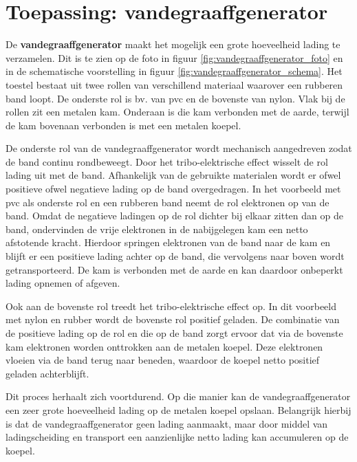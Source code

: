 \documentclass{ximera}
\begin{document}
\section{Toepassing: vandegraaffgenerator}
\begin{example}[foldable=true,title={Toepassing: vandegraaffgenerator}]\nl
    De \textbf{vandegraaffgenerator} maakt het mogelijk een grote hoeveelheid lading te verzamelen. Dit is te zien op de foto in figuur \ref{fig:vandegraaffgenerator_foto} en in de schematische voorstelling in figuur \ref{fig:vandegraaffgenerator_schema}. Het toestel bestaat uit twee rollen van verschillend materiaal waarover een rubberen band loopt. De onderste rol is bv. van pvc en de bovenste van nylon. Vlak bij de rollen zit een metalen kam. Onderaan is die kam verbonden met de aarde, terwijl de kam bovenaan verbonden is met een metalen koepel.

    De onderste rol van de vandegraaffgenerator wordt mechanisch aangedreven zodat de band continu rondbeweegt. Door het tribo-elektrische effect wisselt de rol lading uit met de band. Afhankelijk van de gebruikte materialen wordt er ofwel positieve ofwel negatieve lading op de band overgedragen. In het voorbeeld met pvc als onderste rol en een rubberen band neemt de rol elektronen op van de band. Omdat de negatieve ladingen op de rol dichter bij elkaar zitten dan op de band, ondervinden de vrije elektronen in de nabijgelegen kam een netto afstotende kracht. Hierdoor springen elektronen van de band naar de kam en blijft er een positieve lading achter op de band, die vervolgens naar boven wordt getransporteerd. De kam is verbonden met de aarde en kan daardoor onbeperkt lading opnemen of afgeven.

    Ook aan de bovenste rol treedt het tribo-elektrische effect op. In dit voorbeeld met nylon en rubber wordt de bovenste rol positief geladen. De combinatie van de positieve lading op de rol en die op de band zorgt ervoor dat via de bovenste kam elektronen worden onttrokken aan de metalen koepel. Deze elektronen vloeien via de band terug naar beneden, waardoor de koepel netto positief geladen achterblijft.

    Dit proces herhaalt zich voortdurend. Op die manier kan de vandegraaffgenerator een zeer grote hoeveelheid lading op de metalen koepel opslaan. Belangrijk hierbij is dat de vandegraaffgenerator geen lading aanmaakt, maar door middel van ladingscheiding en transport een aanzienlijke netto lading kan accumuleren op de koepel.


\end{example}
\end{document}
